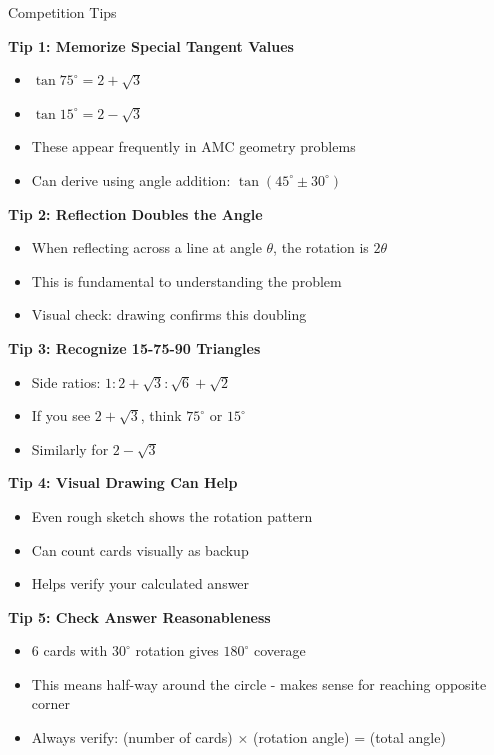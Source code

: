 \documentclass[12pt]{article}
\begin{document}
\begin{protipbox}{Competition Tips}

\textbf{Tip 1: Memorize Special Tangent Values}
\begin{itemize}
    \item $\tan 75^\circ = 2 + \sqrt{3}$
    \item $\tan 15^\circ = 2 - \sqrt{3}$
    \item These appear frequently in AMC geometry problems
    \item Can derive using angle addition: $\tan(45^\circ \pm 30^\circ)$
\end{itemize}

\textbf{Tip 2: Reflection Doubles the Angle}
\begin{itemize}
    \item When reflecting across a line at angle $\theta$, the rotation is $2\theta$
    \item This is fundamental to understanding the problem
    \item Visual check: drawing confirms this doubling
\end{itemize}

\textbf{Tip 3: Recognize 15-75-90 Triangles}
\begin{itemize}
    \item Side ratios: $1 : 2+\sqrt{3} : \sqrt{6}+\sqrt{2}$
    \item If you see $2+\sqrt{3}$, think $75^\circ$ or $15^\circ$
    \item Similarly for $2-\sqrt{3}$
\end{itemize}

\textbf{Tip 4: Visual Drawing Can Help}
\begin{itemize}
    \item Even rough sketch shows the rotation pattern
    \item Can count cards visually as backup
    \item Helps verify your calculated answer
\end{itemize}

\textbf{Tip 5: Check Answer Reasonableness}
\begin{itemize}
    \item 6 cards with $30^\circ$ rotation gives $180^\circ$ coverage
    \item This means half-way around the circle - makes sense for reaching opposite corner
    \item Always verify: (number of cards) $\times$ (rotation angle) = (total angle)
\end{itemize}


\end{protipbox}
\end{document}
